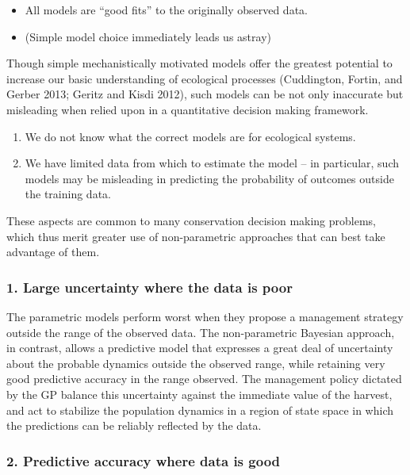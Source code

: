 \documentclass[author-year, review]{elsarticle} %
\begin{document}
\begin{itemize}
\item
  All models are ``good fits'' to the originally observed data.
\item
  (Simple model choice immediately leads us astray)
\end{itemize}

Though simple mechanistically motivated models offer the greatest
potential to increase our basic understanding of ecological processes
(Cuddington, Fortin, and Gerber 2013; Geritz and Kisdi 2012), such
models can be not only inaccurate but misleading when relied upon in a
quantitative decision making framework.

\begin{enumerate}
\def\labelenumi{\arabic{enumi}.}
\itemsep1pt\parskip0pt
\item
  We do not know what the correct models are for ecological systems.
\item
  We have limited data from which to estimate the model -- in
  particular, such models may be misleading in predicting the
  probability of outcomes outside the training data.
\end{enumerate}

These aspects are common to many conservation decision making problems,
which thus merit greater use of non-parametric approaches that can best
take advantage of them.

\subsubsection{1. Large uncertainty where the data is
poor}\label{large-uncertainty-where-the-data-is-poor}

The parametric models perform worst when they propose a management
strategy outside the range of the observed data. The non-parametric
Bayesian approach, in contrast, allows a predictive model that expresses
a great deal of uncertainty about the probable dynamics outside the
observed range, while retaining very good predictive accuracy in the
range observed. The management policy dictated by the GP balance this
uncertainty against the immediate value of the harvest, and act to
stabilize the population dynamics in a region of state space in which
the predictions can be reliably reflected by the data.

\subsubsection{2. Predictive accuracy where data is
good}\label{predictive-accuracy-where-data-is-good}
\end{document}
